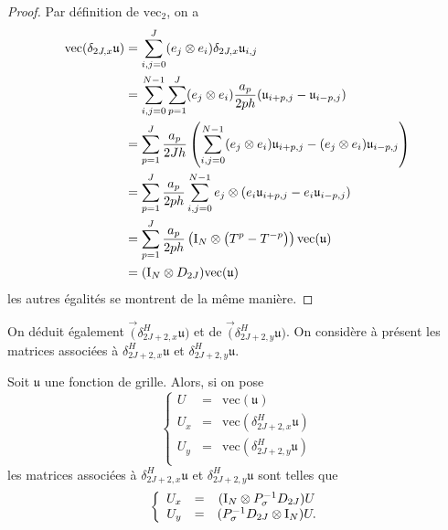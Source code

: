 \begin{proof}
Par définition de $\text{vec}_2$, on a 
\begin{align*}
\text{vec} (\delta_{2J,x} \mathfrak{u}) & = \displaystyle\sum\limits_{i,j=0}^J (e_j \otimes e_i) \delta_{2J,x} \mathfrak{u}_{i,j} \\
	& = \displaystyle\sum\limits_{i,j=0}^{N-1} \displaystyle\sum\limits_{p=1}^J (e_j \otimes e_i) \dfrac{a_p}{2ph} (\mathfrak{u}_{i+p,j} - \mathfrak{u}_{i-p,j}) \\
	& = \displaystyle\sum\limits_{p=1}^J \dfrac{a_p}{2Jh} \left( \displaystyle\sum\limits_{i,j=0}^{N-1} (e_j \otimes e_i) \mathfrak{u}_{i+p,j} - (e_j \otimes e_i) \mathfrak{u}_{i-p,j} \right) \\
	& = \displaystyle\sum\limits_{p=1}^J \dfrac{a_p}{2ph} \displaystyle\sum\limits_{i,j=0}^{N-1} e_j \otimes (e_i \mathfrak{u}_{i+p,j} - e_i\mathfrak{u}_{i-p,j})\\
	& = \displaystyle\sum\limits_{p=1}^J \dfrac{a_p}{2ph} \left( \text{I}_N \otimes \left( T^p - T^{-p}  \right) \right) \text{vec} (\mathfrak{u}) \\
	& = (\text{I}_N \otimes D_{2J}) \text{vec} (\mathfrak{u})
\end{align*}
les autres égalités se montrent de la même manière.
\end{proof}
On déduit également $\vec(\delta_{2J+2,x}^H \mathfrak{u})$ et de $\vec(\delta_{2J+2,y}^H \mathfrak{u})$.
On considère à présent les matrices associées à $\delta^H_{2J+2,x} \mathfrak{u}$ et $\delta^H_{2J+2,y} \mathfrak{u}$.
\begin{theoreme}
Soit $\mathfrak{u}$ une fonction de grille. Alors, si on pose 
\begin{equation}
\left\lbrace
\begin{array}{rcl}
U & = & \text{vec} (\mathfrak{u}) \\
U_x & = & \text{vec} (\delta_{2J+2,x}^H \mathfrak{u}) \\
U_y & = & \text{vec} (\delta_{2J+2,y}^H \mathfrak{u}) \\
\end{array}
\right.
\end{equation}
les matrices associées à $\delta^H_{2J+2,x} \mathfrak{u}$ et $\delta^H_{2J+2,y} \mathfrak{u}$ sont telles que 
\begin{equation}
\left\lbrace
\begin{array}{rcccl}
U_x &=& (\text{I}_N \otimes P^{-1}_{\sigma} D_{2J})U \\
U_y &=& (P^{-1}_{\sigma}D_{2J} \otimes \text{I}_N)U.
\end{array}
\right.
\end{equation}
\end{theoreme}

